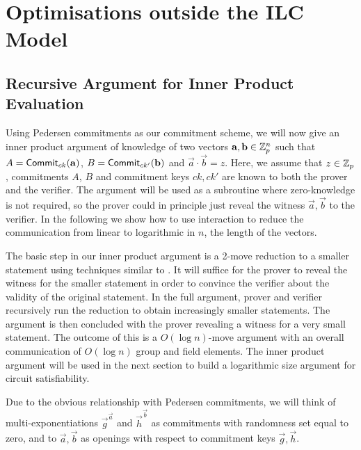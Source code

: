 \chapter{Optimisations outside the ILC Model}
\label{chapterlabel:Special-Optimisations}

\section{Recursive Argument for Inner Product Evaluation}\label{se:innerproduct}

Using Pedersen commitments as our commitment scheme, we will now give an inner product argument of knowledge of two vectors $\mathbf{a},\mathbf{b}\in \mathbb{Z}_p^n$ such that $A=\mathsf{Commit}_{ck}(\mathbf{a})$, $B=\mathsf{Commit}_{ck'}(\mathbf{b})$ and $\vec{a}\cdot \vec{b}=z$. Here, we assume that $z \in \mathbb{Z}_p$, commitments $A$, $B$ and commitment keys $ck,ck'$ are known to both the prover and the verifier. The argument will be used as a subroutine where zero-knowledge is not required, so the prover could in principle just reveal the witness $\vec{a},\vec{b}$ to the verifier. In the following we show how to use interaction to reduce the communication from linear to logarithmic in $n$, the length of the vectors.

The basic step in our inner product argument is a 2-move reduction to a smaller statement using techniques similar to \cite{BG12}. It will suffice for the prover to reveal the witness for the smaller statement in order to convince the verifier about the validity of the original statement.
In the full argument, prover and verifier recursively run the reduction to obtain increasingly smaller statements. The argument is then concluded with the prover revealing a %
witness for a very small statement.
The outcome of this is a $O(\log{n})$-move argument with an overall communication of $O(\log{n})$ group and field elements. The inner product argument will be used in the next section to build a logarithmic size argument for circuit satisfiability. 

Due to the obvious relationship with Pedersen commitments, we will think of multi-exponentiations $\vec{g}^{\vec{a}}$ and $\vec{h}^{\vec{b}}$ as commitments with randomness set equal to zero, and to $\vec{a},\vec{b}$ as openings with respect to commitment keys $\vec{g},\vec{h}$.


